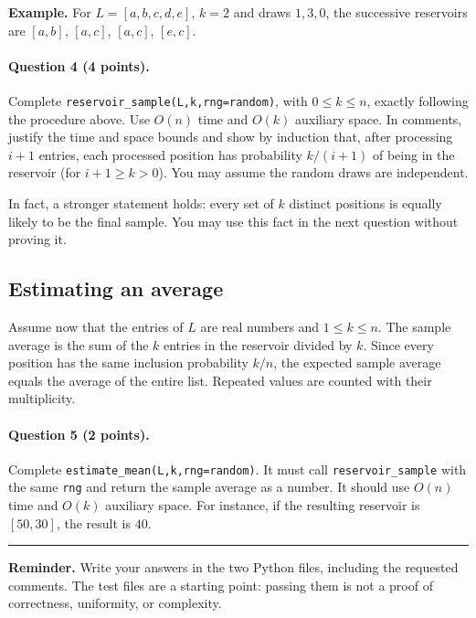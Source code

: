 \documentclass[11pt,a4paper]{article}
\newcommand{\q}[2]{\paragraph{Question #1 (#2 points).}}
\begin{document}
\textbf{Example.} For $L=[a,b,c,d,e]$, $k=2$ and draws $1,3,0$, the successive reservoirs are $[a,b]$, $[a,c]$, $[a,c]$, $[e,c]$.
\q{4}{4} Complete \texttt{reservoir\_sample(L,k,rng=random)}, with $0\le k\le n$, exactly following the procedure above. Use $O(n)$ time and $O(k)$ auxiliary space. In comments, justify the time and space bounds and show by induction that, after processing $i+1$ entries, each processed position has probability $k/(i+1)$ of being in the reservoir (for $i+1\ge k>0$). You may assume the random draws are independent.

In fact, a stronger statement holds: every set of $k$ distinct positions is equally likely to be the final sample. You may use this fact in the next question without proving it.
\newpage
\subsection*{Estimating an average}
Assume now that the entries of $L$ are real numbers and $1\le k\le n$. The sample average is the sum of the $k$ entries in the reservoir divided by $k$. Since every position has the same inclusion probability $k/n$, the expected sample average equals the average of the entire list. Repeated values are counted with their multiplicity.
\q{5}{2} Complete \texttt{estimate\_mean(L,k,rng=random)}. It must call \texttt{reservoir\_sample} with the same \texttt{rng} and return the sample average as a number. It should use $O(n)$ time and $O(k)$ auxiliary space. For instance, if the resulting reservoir is $[50,30]$, the result is $40$.

\vspace{1cm}\hrule\vspace{5pt}
\textbf{Reminder.} Write your answers in the two Python files, including the requested comments. The test files are a starting point: passing them is not a proof of correctness, uniformity, or complexity.
\end{document}

